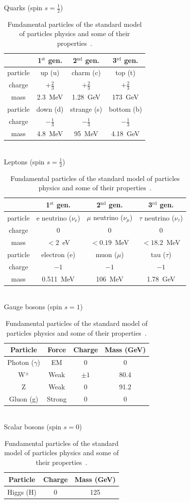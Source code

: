 \begin{table}[t]
\centering
Quarks (spin $s=\frac{1}{2}$) \\
\begin{tabular}{c|c|c|c}
\hline
& 1$^{\mathrm{st}}$ gen. & 2$^{\mathrm{nd}}$ gen. & 3$^{\mathrm{rd}}$ gen. \\ 
\hline
particle & up (u) & charm (c) & top (t) \\
charge & $+\frac{2}{3}$ & $+\frac{2}{3}$ & $+\frac{2}{3}$ \\
mass & 2.3~MeV & 1.28~GeV & 173~GeV \\
\hline
particle & down (d) & strange (s) & bottom (b) \\
charge & $-\frac{1}{3}$ & $-\frac{1}{3}$ & $-\frac{1}{3}$ \\
mass & 4.8~MeV & 95~MeV & 4.18~GeV \\
\hline
\end{tabular} \\ \vspace{0.5cm}
Leptons (spin $s=\frac{1}{2}$) \\
\begin{tabular}{c|c|c|c}
\hline
& 1$^{\mathrm{st}}$ gen. & 2$^{\mathrm{nd}}$ gen. & 3$^{\mathrm{rd}}$ gen. \\ 
\hline
particle & e neutrino ($\nu_{\mathrm{e}}$) & $\mu$ neutrino ($\nu_\mu$) & 
$\tau$ neutrino ($\nu_\tau$) \\
charge & 0 & 0 & 0 \\
mass & $<2$~eV & $<0.19$~MeV & $<18.2$~MeV \\
\hline
particle & electron (e) & muon ($\mu$) & tau ($\tau$) \\
charge & $-1$ & $-1$ & $-1$ \\
mass & 0.511~MeV & 106~MeV & 1.78~GeV \\
\hline
\end{tabular} \\ \vspace{0.5cm}
Gauge bosons (spin $s=1$) \\
\begin{tabular}{cccc}
\hline
Particle & Force & Charge & Mass (GeV) \\ \hline
Photon ($\gamma$) & EM & 0 & 0 \\
W$^{\pm}$ & Weak & $\pm1$ & 80.4 \\
Z & Weak & 0 & 91.2 \\
Gluon (g) & Strong & 0 & 0 \\
\hline
\end{tabular} \\ \vspace{0.5cm}
Scalar bosons (spin $s=0$) \\
\begin{tabular}{ccc}
\hline
Particle & Charge & Mass (GeV) \\ \hline
Higgs (H) & 0 & 125 \\
\hline
\end{tabular} \\ \vspace{0.5cm}
\caption{Fundamental particles of the standard model of particles physics and 
some of their properties~\cite{pdg12}.}
\label{tab:sm}
\end{table}

